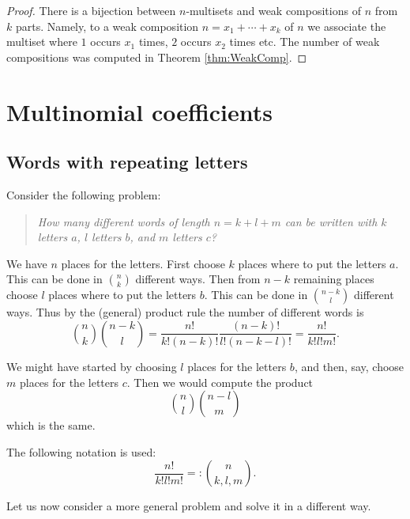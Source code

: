 \begin{page}
\setcounter{section}{4}
\setcounter{subsection}{0}
\setcounter{dfn}{15}
\label{portion:109}

\begin{proof}
There is a bijection between $n$-multisets and weak compositions of $n$ from $k$ parts.
Namely, to a weak composition $n = x_1 + \cdots + x_k$ of $n$ we associate the multiset
where $1$ occurs $x_1$ times, $2$ occurs $x_2$ times etc.
The number of weak compositions was computed in Theorem \ref{thm:WeakComp}.
\end{proof}



\end{page}

\begin{page}
\setcounter{section}{4}
\setcounter{subsection}{1}
\setcounter{dfn}{0}
\label{portion:110}

\section{Multinomial coefficients}

\end{page}

\begin{page}
\setcounter{section}{4}
\setcounter{subsection}{1}
\setcounter{dfn}{0}
\label{portion:111}

\subsection{Words with repeating letters}
Consider the following problem:
\begin{quote}
\emph{How many different words of length $n=k+l+m$ can be written with $k$ letters $a$, $l$ letters $b$, and $m$ letters $c$?}
\end{quote}

We have $n$ places for the letters.
First choose $k$ places where to put the letters $a$.
This can be done in $\binom{n}{k}$ different ways.
Then from $n-k$ remaining places choose $l$ places where to put the letters $b$.
This can be done in $\binom{n-k}{l}$ different ways.
Thus by the (general) product rule the number of different words is
\[
\binom{n}{k} \binom{n-k}{l} = \frac{n!}{k!(n-k)!} \frac{(n-k)!}{l!(n-k-l)!} = \frac{n!}{k!l!m!}.
\]

We might have started by choosing $l$ places for the letters $b$, and then, say, choose $m$ places for the letters $c$.
Then we would compute the product
\[
\binom{n}{l} \binom{n-l}{m}
\]
which is the same.

The following notation is used:
\[
\frac{n!}{k!l!m!} =: \binom{n}{k, l, m}.
\]

Let us now consider a more general problem and solve it in a different way.


\end{page}

